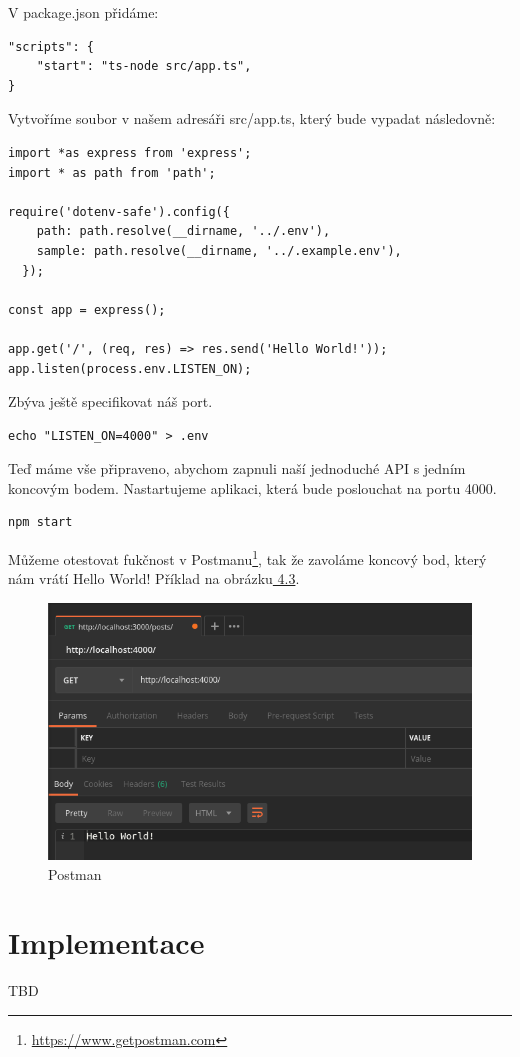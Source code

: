 \documentclass[thesis=B,czech]{FITthesis}[2012/06/26]
\begin{document}
        V package.json přidáme:
        \begin{verbatim}
"scripts": {
    "start": "ts-node src/app.ts",
}
        \end{verbatim}
        Vytvoříme soubor v našem adresáři src/app.ts, který bude vypadat následovně:
        \begin{verbatim}
import *as express from 'express';
import * as path from 'path';

require('dotenv-safe').config({
    path: path.resolve(__dirname, '../.env'),
    sample: path.resolve(__dirname, '../.example.env'),
  });

const app = express();

app.get('/', (req, res) => res.send('Hello World!'));
app.listen(process.env.LISTEN_ON);
        \end{verbatim}
        Zbýva ještě specifikovat náš port.
        \begin{verbatim}
echo "LISTEN_ON=4000" > .env
        \end{verbatim}
        Teď máme vše připraveno, abychom zapnuli naší jednoduché API s jedním koncovým bodem. Nastartujeme aplikaci, která bude poslouchat na portu 4000.  
        \begin{verbatim}
npm start
        \end{verbatim}
        Můžeme otestovat fukčnost v Postmanu\footnote{\url{https://www.getpostman.com}}, tak že zavoláme koncový bod, který nám vrátí Hello World! Příklad na obrázku\hyperref[fig:Postman]{ 4.3}.
        \begin{figure}[h!]
            \includegraphics[scale=0.45]{PostmanHelloWorld}
            \caption{Postman}
        \end{figure}
    \section{Implementace}
        TBD
\end{document}
